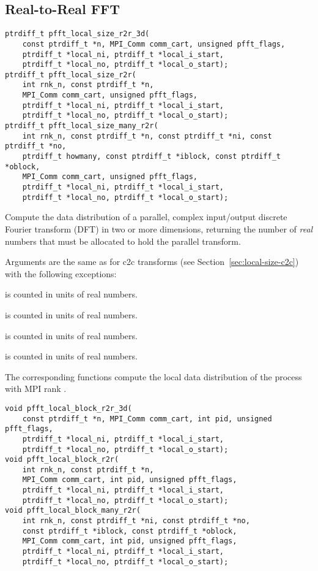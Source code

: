 \subsection{Real-to-Real FFT}\label{sec:local-size-r2r}
\begin{lstlisting}
ptrdiff_t pfft_local_size_r2r_3d(
    const ptrdiff_t *n, MPI_Comm comm_cart, unsigned pfft_flags,
    ptrdiff_t *local_ni, ptrdiff_t *local_i_start,
    ptrdiff_t *local_no, ptrdiff_t *local_o_start);
ptrdiff_t pfft_local_size_r2r(
    int rnk_n, const ptrdiff_t *n,
    MPI_Comm comm_cart, unsigned pfft_flags,
    ptrdiff_t *local_ni, ptrdiff_t *local_i_start,
    ptrdiff_t *local_no, ptrdiff_t *local_o_start);
ptrdiff_t pfft_local_size_many_r2r(
    int rnk_n, const ptrdiff_t *n, const ptrdiff_t *ni, const ptrdiff_t *no,
    ptrdiff_t howmany, const ptrdiff_t *iblock, const ptrdiff_t *oblock,
    MPI_Comm comm_cart, unsigned pfft_flags,
    ptrdiff_t *local_ni, ptrdiff_t *local_i_start,
    ptrdiff_t *local_no, ptrdiff_t *local_o_start);
\end{lstlisting}
Compute the data distribution of a parallel, complex input/output discrete Fourier transform (DFT) in two or more dimensions,
returning the number of \emph{real} numbers that must be allocated to hold the parallel transform.

Arguments are the same as for c2c transforms (see Section~\ref{sec:local-size-c2c}) with the following exceptions:
\begin{compactitem}
  \item {} is counted in units of real numbers.
  \item {} is counted in units of real numbers.
  \item {} is counted in units of real numbers.
  \item {} is counted in units of real numbers.
\end{compactitem}

The corresponding  functions compute the local data distribution of the process with MPI rank .
\begin{lstlisting}
void pfft_local_block_r2r_3d(
    const ptrdiff_t *n, MPI_Comm comm_cart, int pid, unsigned pfft_flags,
    ptrdiff_t *local_ni, ptrdiff_t *local_i_start,
    ptrdiff_t *local_no, ptrdiff_t *local_o_start);
void pfft_local_block_r2r(
    int rnk_n, const ptrdiff_t *n,
    MPI_Comm comm_cart, int pid, unsigned pfft_flags,
    ptrdiff_t *local_ni, ptrdiff_t *local_i_start,
    ptrdiff_t *local_no, ptrdiff_t *local_o_start);
void pfft_local_block_many_r2r(
    int rnk_n, const ptrdiff_t *ni, const ptrdiff_t *no,
    const ptrdiff_t *iblock, const ptrdiff_t *oblock,
    MPI_Comm comm_cart, int pid, unsigned pfft_flags,
    ptrdiff_t *local_ni, ptrdiff_t *local_i_start,
    ptrdiff_t *local_no, ptrdiff_t *local_o_start);
\end{lstlisting}


